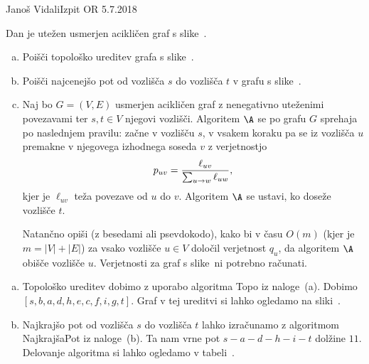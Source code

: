 \begin{naloga}{Janoš Vidali}{Izpit OR 5.7.2018}
\begin{vprasanje}
Dan je utežen usmerjen acikličen graf s slike~\fig.

\begin{enumerate}[(a)]
\item Poišči topološko ureditev grafa s slike~\fig.

\item Poišči najcenejšo pot od vozlišča $s$ do vozlišča $t$
v grafu s slike~\fig.

\item Naj bo $G = (V, E)$ usmerjen acikličen graf
z nenegativno uteženimi povezavami
ter $s, t \in V$ njegovi vozlišči.
Algoritem $\A$ se po grafu $G$ sprehaja po naslednjem pravilu:
začne v vozlišču $s$,
v vsakem koraku pa se iz vozlišča $u$ premakne
v njegovega izhodnega soseda $v$ z verjetnostjo
$$
p_{uv} = {\ell_{uv} \over \sum_{u \to w} \ell_{uw}} ,
$$
kjer je $\ell_{uv}$ teža povezave od $u$ do $v$.
Algoritem $\A$ se ustavi, ko doseže vozlišče $t$.

Natančno opiši (z besedami ali psevdokodo),
kako bi v času $O(m)$ (kjer je $m = |V| + |E|$)
za vsako vozlišče $u \in V$ določil verjetnost $q_u$,
da algoritem $\A$ obišče vozlišče $u$.
Verjetnosti za graf s slike~\fig ni potrebno računati.
\end{enumerate}

\begin{slika}
\pgfslika
{}
\end{slika}
\end{vprasanje}

\begin{odgovor}
\begin{enumerate}[(a)]
\item Topološko ureditev dobimo z uporabo algoritma {\sc Topo}
iz naloge~\res[topo]{}(a).
Dobimo $[s, b, a, d, h, e, c, f, i, g, t]$. 
Graf v tej ureditvi si lahko ogledamo na sliki~.

\item Najkrajšo pot od vozlišča $s$ do vozlišča $t$
lahko izračunamo z algoritmom {\sc NajkrajšaPot} iz naloge~\res[topo]{}(b).
Ta nam vrne pot $s - a - d - h - i - t$ dolžine $11$.
Delovanje algoritma si lahko ogledamo v tabeli~\tab.


\end{enumerate}
\end{odgovor}
\end{naloga}
